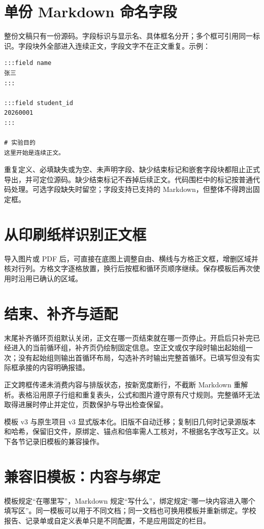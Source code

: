\section{单份 Markdown 命名字段}
整份文稿只有一份源码。字段标识与显示名、具体框名分开；多个框可引用同一标识。字段块外全部进入连续正文，字段文字不在正文重复。示例：
\begin{verbatim}
:::field name
张三
:::

:::field student_id
20260001
:::

# 实验目的
这里开始是连续正文。
\end{verbatim}

重复定义、必填缺失或为空、未声明字段、缺少结束标记和嵌套字段块都阻止正式导出，并可定位源码。缺少结束标记不吞掉后续正文。代码围栏中的标记按普通代码处理。可选字段缺失时留空；字段支持已支持的 Markdown，但整体不得跨出固定框。

\section{从印刷纸样识别正文框}
导入图片或 PDF 后，可直接在底图上调整自由、横线与方格正文框，增删区域并核对行列。方格文字逐格放置，换行后按框和循环页顺序继续。保存模板后再次使用时沿用已确认的区域。

\section{结束、补齐与适配}
末尾补齐循环页组默认关闭，正文在哪一页结束就在哪一页停止。开启后只补完已经进入的当前循环组，补齐页仍绘制固定信息。空正文或仅字段时输出起始组一次；没有起始组则输出首循环布局，勾选补齐时输出完整首循环。已填写但没有实际框承接的内容明确报错。

正文跨框传递未消费内容与排版状态，按新宽度断行，不截断 Markdown 重解析。表格沿用原子行组和重复表头，公式和图片遵守原有尺寸规则。完整循环无法取得进展时停止并定位，页数保护与导出检查保留。

模板 v3 与原生项目 v3 显式版本化。旧版不自动迁移；复制旧几何时记录源版本和哈希，保留旧文件，原绑定、锚点和倍率需人工核对，不根据名字改写正文。以下各节记录旧模板的兼容操作。

\section{兼容旧模板：内容与绑定}
模板规定“在哪里写”，Markdown 规定“写什么”，绑定规定“哪一块内容进入哪个填写区”。同一模板可以用于不同文档；同一文档也可换用模板并重新绑定。学校报告、记录单或自定义表单只是不同配置，不是应用固定的栏目。

